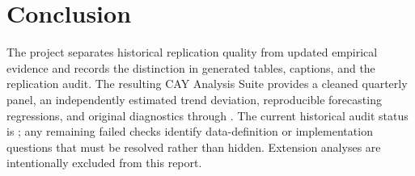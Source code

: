 \section{Conclusion}

The project separates historical replication quality from updated empirical
evidence and records the distinction in generated tables, captions, and the
replication audit. The resulting CAY Analysis Suite provides a cleaned
quarterly panel, an independently estimated trend deviation, reproducible
forecasting regressions, and original diagnostics through \UpdatedSampleEnd.
The current historical audit status is \texttt{\OverallReplicationStatus}; any
remaining failed checks identify data-definition or implementation questions
that must be resolved rather than hidden. Extension analyses are intentionally
excluded from this report.
